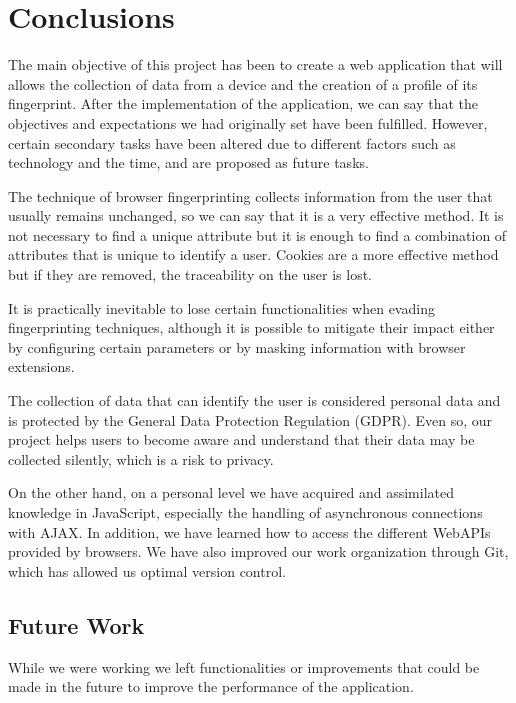 \chapter{Conclusions}
\label{ch:conclusions}
The main objective of this project has been to create a web application that will allows the collection of data from a device and the creation of a profile of its fingerprint. After the implementation of the application, we can say that the objectives and expectations we had originally set have been fulfilled. However, certain secondary tasks have been altered due to different factors such as technology and the time, and are proposed as future tasks. \par

The technique of browser fingerprinting collects information from the user that usually remains unchanged, so we can say that it is a very effective method. It is not necessary to find a unique attribute but it is enough to find a combination of attributes that is unique to identify a user. Cookies are a more effective method but if they are removed, the traceability on the user is lost. \par 

It is practically inevitable to lose certain functionalities when evading fingerprinting techniques, although it is possible to mitigate their impact either by configuring certain parameters or by masking information with browser extensions. \par 

The collection of data that can identify the user is considered personal data and is protected by the General Data Protection Regulation (GDPR). Even so, our project helps users to become aware and understand that their data may be collected silently, which is a risk to privacy. \par

On the other hand, on a personal level we have acquired and assimilated knowledge in JavaScript, especially the handling of asynchronous connections with AJAX. In addition, we have learned how to access the different WebAPIs provided by browsers.
We have also improved our work organization through Git, which has allowed us optimal version control. \par

\section{Future Work}

While we were working we left functionalities or improvements that could be made in the future to improve the performance of the application.

